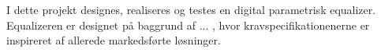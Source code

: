 I dette projekt designes, realiseres og testes en digital parametrisk equalizer. Equalizeren er designet på baggrund af ... , hvor kravspecifikationenerne er inspireret af allerede markedsførte løsninger.